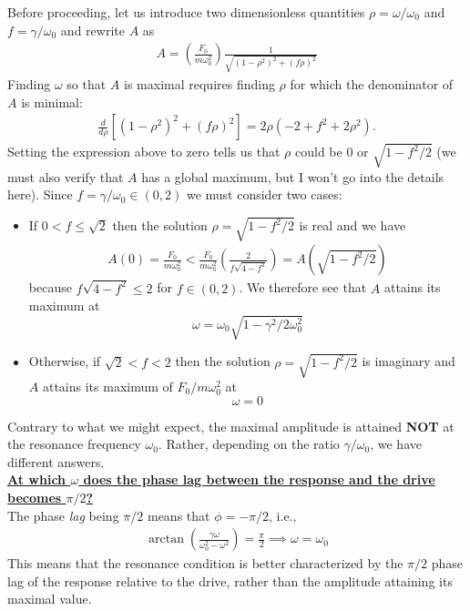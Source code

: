 \documentclass{book}
\theoremstyle{definition}
\newcommand{\f}[2]{\frac{#1}{#2}}
\newcommand{\lp}{\left(}
\newcommand{\rp}{\right)}
\newcommand{\lb}{\left[}
\newcommand{\rb}{\right]}
\begin{document}
Before proceeding, let us introduce two dimensionless quantities $\rho = \omega/\omega_0$ and $f = \gamma/\omega_0$ and rewrite $A$ as 
\begin{align*}
A =  \lp \f{F_0}{m \omega_0^2}\rp \f{1}{\sqrt{(1-\rho^2)^2 + (f\rho)^2}}
\end{align*}
Finding $\omega$ so that $A$ is maximal requires finding $\rho$ for which the denominator of $A$ is minimal:
\begin{align*}
\f{d}{d\rho}\lb (1-\rho^2)^2 + (f\rho)^2 \rb = 2\rho(-2 + f^2 + 2\rho^2).
\end{align*}
Setting the expression above to zero tells us that $\rho$ could be $0$ or $\sqrt{1-f^2/2}$ (we must also verify that $A$ has a global maximum, but I won't go into the details here). Since $f = \gamma/\omega_0 \in (0,2)$ we must consider two cases:
\begin{itemize}
	\item If ${0 < f \leq \sqrt{2}}$ then the solution $\rho = \sqrt{1-f^2/2}$ is real and we have 
	\begin{align*}
	A(0)= \f{F_0}{m\omega_0^2} <  \f{F_0}{m\omega_0^2} \lp \f{2}{f\sqrt{4-f^2}}\rp  = A\lp \sqrt{1-f^2/2}\rp
	\end{align*}
	because $f\sqrt{4-f^2} \leq 2$ for $f\in (0,2)$. We therefore see that $A$ attains its maximum at $$\boxed{\omega = \omega_0 \sqrt{1- \gamma^2/2\omega_0^2}}$$
	
	
	
	\item Otherwise, if ${\sqrt{2} < f < 2}$ then the solution $\rho = \sqrt{1-f^2/2}$ is imaginary and $A$ attains its maximum of $F_0/m\omega_0^2$ at $$\boxed{\omega = 0}$$
\end{itemize}
Contrary to what we might expect, the maximal amplitude is attained \textbf{NOT} at the resonance frequency $\omega_0$. Rather, depending on the ratio $\gamma/\omega_0$, we have different answers. \\



\noindent \textbf{\underline{At which $\omega$ does the phase lag between the response and the drive becomes $\pi/2$?}} \\



The phase \textit{lag} being $\pi/2$ means that $\phi = -\pi/2$, i.e.,
\begin{align*}
\arctan\lp \f{\gamma \omega}{\omega_0^2 - \omega^2} \rp = \f{\pi}{2} \implies \boxed{\omega = \omega_0}
\end{align*}
This means that the resonance condition is better characterized by the $\pi/2$ phase lag of the response relative to the drive, rather than the amplitude attaining its maximal value. \\
\end{document}
